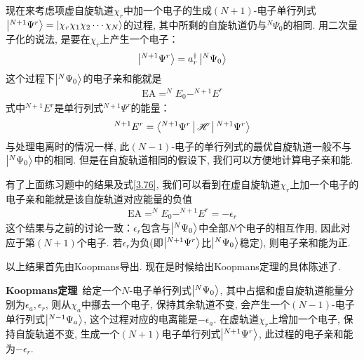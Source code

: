 
现在来考虑项虚自旋轨道$\chi_r$中加一个电子的生成$(N+1)$-电子单行列式$\Ket{^{N+1}\Psi^r}=\Ket{\chi_r\chi_1\chi_2\cdots\chi_N}$的过程, 
其中所剩的自旋轨道仍与$^N\Psi_0$的相同. 
用二次量子化的说法, 
是要在$\chi_r$上产生一个电子：
\begin{align}
	\Ket{^{N+1}\Psi^r} = a^\dagger_r\Ket{^N\Psi_0}
\end{align}
这个过程下$\Ket{^N\Psi_0}$的电子亲和能就是
\begin{align}
	\mathrm{EA} = ^NE_0 - ^{N+1}E^r
\end{align}
式中$ ^{N+1}E^r$是单行列式$^{N+1}\Psi^r$的能量：
\begin{align}
	^{N+1}E^r = \Braket{^{N+1}\Psi^r|\mathscr{H}|^{N+1}\Psi^r}
\end{align}
与处理电离时的情况一样, 
此$(N-1)$-电子的单行列式的最优自旋轨道一般不与$\Ket{^N\Psi_0}$中的相同. 
但是在自旋轨道相同的假设下, 
我们可以方便地计算电子亲和能.


有了上面练习题中的结果及式\eqref{3.76}, 
我们可以看到在虚自旋轨道$\chi_r$上加一个电子的电子亲和能就是该自旋轨道对应能量的负值
\begin{align}
	\mathrm{EA} = ^{N}E_0 - ^{N+1}E^r = -\epsilon_r
\end{align}
这个结果与之前的讨论一致：$\epsilon_r$包含与$\Ket{^N\Psi_0}$中全部$N$个电子的相互作用, 
因此对应于第$(N+1)$个电子. 
若$\epsilon_r$为负(即$\Ket{^{N+1}\Psi^r}$比$\Ket{^N\Psi_0}$稳定), 
则电子亲和能为正.


以上结果首先由Koopmans导出. 
现在是时候给出Koopmans定理的具体陈述了.


\textbf{Koopmans定理}\ 给定一个$N$-电子\hft 单行列式$\Ket{^N\Psi_0}$, 其中占据和虚自旋轨道能量分别为$\epsilon_a,\epsilon_r$, 则从$\chi_a$中挪去一个电子, 保持其余轨道不变, 会产生一个$(N-1)$-电子单行列式$\Ket{^{N-1}\Psi_a}$, 这个过程对应的电离能是$-\epsilon_a$. 
在虚轨道$\chi_r$上增加一个电子, 保持自旋轨道不变, 生成一个$(N+1)$电子单行列式$\Ket{^{N+1}\Psi^r}$, 此过程的电子亲和能为$-\epsilon_r$.


